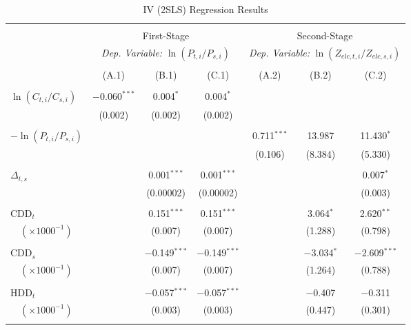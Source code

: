 \documentclass[12pt,a4paper]{extarticle}
\begin{document}
\begin{table}[!htbp] \centering 
	\caption{IV (2SLS) Regression Results}
	\label{table:2} 
	\small
	\begin{tabular}{@{\extracolsep{4pt}}lcccccc} 
		\\[-4ex]\hline  
		\hline \\[-1.6ex] 
		& \multicolumn{3}{c}{First-Stage} & \multicolumn{3}{c}{Second-Stage} \\ [0.5ex]
		& \multicolumn{3}{c}{\textit{Dep. Variable:} $\ln (P_{t,i} / P_{s,i})$ } & \multicolumn{3}{c}{\textit{Dep. Variable:}  $\ln (Z_{elc, t, i} / Z_{elc, s, i})$}\\ [0.5ex]
		\cmidrule(lr){2-4} \cmidrule(lr){5-7}\\[-2.2ex] 
		& (A.1) & (B.1) & (C.1) & (A.2) & (B.2) & (C.2)\\ [0.5ex]
		\hline \\[-1.8ex] 
		$ \ln (C_{t,i} / C_{s,i})$ & $-$0.060$^{***}$ & 0.004$^{*}$ & 0.004$^{*}$ &  &  &  \\ 
		& (0.002) & (0.002) & (0.002) &  &  &  \\ 
		& & & & & & \\ 
		$-\ln (P_{t,i} / P_{s,i})$ &  &  &  & 0.711$^{***}$ & 13.987 & 11.430$^{*}$ \\ 
		&  &  &  & (0.106) & (8.384) & (5.330) \\ 
		& & & & & & \\ 
		$\Delta_{t,s}$  &  & 0.001$^{***}$ & 0.001$^{***}$ &  &  & 0.007$^{*}$ \\ 
		&  & (0.00002) & (0.00002) &  &  & (0.003) \\ 
		& & & & & & \\ 
		CDD$_t$  &  & 0.151$^{***}$ & 0.151$^{***}$ &  & 3.064$^{*}$ & 2.620$^{**}$ \\ 
		$\quad(\times 1000^{-1})$&  & (0.007) & (0.007) &  & (1.288) & (0.798) \\ 
		& & & & & & \\ 
		CDD$_s$  &  & $-$0.149$^{***}$ & $-$0.149$^{***}$ &  & $-$3.034$^{*}$ & $-$2.609$^{***}$ \\ 
		$\quad(\times 1000^{-1})$&  & (0.007) & (0.007) &  & (1.264) & (0.788) \\ 
		& & & & & & \\ 
		HDD$_t$  &  & $-$0.057$^{***}$ & $-$0.057$^{***}$ &  & $-$0.407 & $-$0.311 \\ 
		$\quad(\times 1000^{-1})$&  & (0.003) & (0.003) &  & (0.447) & (0.301) \\ 
		& & & & & & \\ 

\end{tabular}
\end{table}
\end{document}
